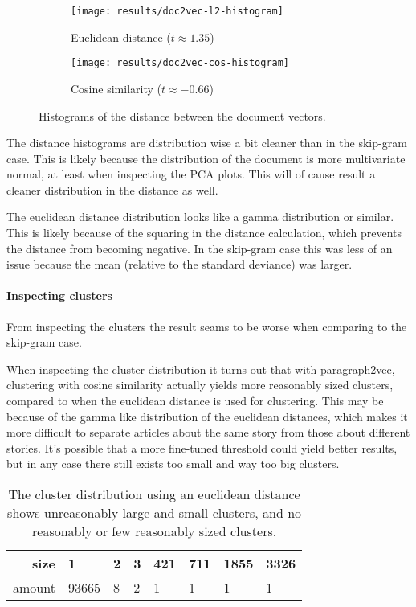 \begin{figure}[H]
        \centering
        \begin{subfigure}[b]{0.49\textwidth}
                \texttt{[image: results/doc2vec-l2-histogram]}
                \caption{Euclidean distance ($t \approx 1.35$)}
        \end{subfigure}
        \begin{subfigure}[b]{0.49\textwidth}
                \texttt{[image: results/doc2vec-cos-histogram]}
                \caption{Cosine similarity ($t \approx -0.66$)}
        \end{subfigure}
        \caption{Histograms of the distance between the document vectors.}
\end{figure}

The distance histograms are distribution wise a bit cleaner than in the skip-gram case. This is likely because the distribution of the document is more multivariate normal, at least when inspecting the PCA plots. This will of cause result a cleaner distribution in the distance as well.

The euclidean distance distribution looks like a gamma distribution or similar. This is likely because of the squaring in the distance calculation, which prevents the distance from becoming negative. In the skip-gram case this was less of an issue because the mean (relative to the standard deviance) was larger.

\paragraph{Inspecting clusters} From inspecting the clusters the result seams to be worse when comparing to the skip-gram case.

When inspecting the cluster distribution it turns out that with paragraph2vec, clustering with cosine similarity actually yields more reasonably sized clusters, compared to when the euclidean distance is used for clustering. This may be because of the gamma like distribution of the euclidean distances, which makes it more difficult to separate articles about the same story from those about different stories. It's possible that a more fine-tuned threshold could yield better results, but in any case there still exists too small and way too big clusters.

\begin{table}[H]
\centering
\begin{tabular}{r|l l l l l l l }
size & 1 & 2 & 3 & 421 & 711 & 1855 & 3326 \\ \hline
amount & 93665 & 8 & 2 & 1 & 1 & 1 & 1
\end{tabular}
\caption{The cluster distribution using an euclidean distance shows unreasonably large and small clusters, and no reasonably or few reasonably sized clusters.}
\end{table}

